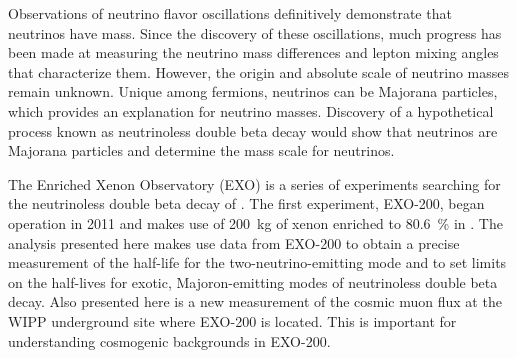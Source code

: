 Observations of neutrino flavor oscillations definitively demonstrate that neutrinos have mass. Since the discovery of these oscillations, much progress has been made at measuring the neutrino mass differences and lepton mixing angles that characterize them. However, the origin and absolute scale of neutrino masses remain unknown. Unique among fermions, neutrinos can be Majorana particles, which provides an explanation for neutrino masses. Discovery of a hypothetical process known as neutrinoless double beta decay would show that neutrinos are Majorana particles and determine the mass scale for neutrinos.

The Enriched Xenon Observatory (EXO) is a series of experiments searching for the neutrinoless double beta decay of . The first experiment, EXO-200, began operation in 2011 and makes use of \SI{200}{\kg} of xenon enriched to \SI{80.6}{\percent} in . The analysis presented here makes use data from EXO-200 to obtain a precise measurement of the half-life for the two-neutrino-emitting mode and to set limits on the half-lives for exotic, Majoron-emitting modes of neutrinoless double beta decay. Also presented here is a new measurement of the cosmic muon flux at the WIPP underground site where EXO-200 is located. This is important for understanding cosmogenic backgrounds in EXO-200.
